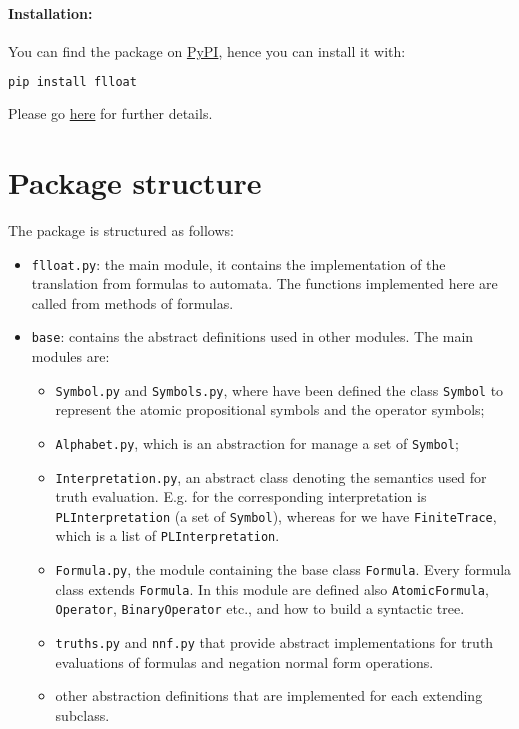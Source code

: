 \paragraph{Installation:} You can find the package on \href{https://pypi.org/project/flloat/}{PyPI}, hence you can install it with:
\begin{lstlisting}[language=bash]
pip install flloat
\end{lstlisting}
Please go \href{https://github.com/MarcoFavorito/flloat#install}{here} for further details.


\section{Package structure}
The package is structured as follows:
\begin{itemize}
	\item \texttt{flloat.py}: the main module, it contains the implementation of the translation from \LLf formulas to automata. The functions implemented here are called from methods of \LLf formulas.
	\item \texttt{base}: contains the abstract definitions used in other modules. The main modules are:
	\begin{itemize}
		\item \texttt{Symbol.py} and \texttt{Symbols.py}, where have been defined the class \texttt{Symbol} to represent the atomic propositional symbols and the operator symbols;
		\item \texttt{Alphabet.py}, which is an abstraction for manage a set of \texttt{Symbol};
		\item \texttt{Interpretation.py}, an abstract class denoting the semantics used for truth evaluation. E.g. for \PL the corresponding interpretation is \texttt{PLInterpretation} (a set of \texttt{Symbol}), whereas for \LLf we have \texttt{FiniteTrace}, which is a list of \texttt{PLInterpretation}.
		\item \texttt{Formula.py}, the module containing the base class \texttt{Formula}. Every formula class extends \texttt{Formula}. In this module are defined also \texttt{AtomicFormula}, \texttt{Operator}, \texttt{BinaryOperator} etc., and how to build a syntactic tree. 
		\item \texttt{truths.py} and \texttt{nnf.py} that provide abstract implementations for truth evaluations of formulas and negation normal form operations.
		\item other abstraction definitions that are implemented for each extending subclass.

\end{itemize}
\end{itemize}
